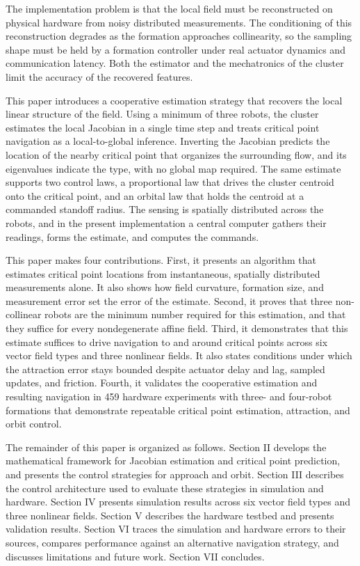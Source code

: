 \documentclass[lettersize,journal]{IEEEtran}
\newcommand{\rev}[1]{#1}
\begin{document}
The implementation problem is that the local field must be reconstructed on physical hardware from noisy distributed measurements. The conditioning of this reconstruction degrades as the formation approaches collinearity, so the sampling shape must be held by a formation controller under real actuator dynamics and communication latency. Both the estimator and the mechatronics of the cluster limit the accuracy of the recovered features.

This paper introduces a cooperative estimation strategy that recovers the local linear structure of the field. Using a minimum of three robots, the cluster estimates the local Jacobian in a single time step and treats critical point navigation as a local-to-global inference. Inverting the Jacobian predicts the location of the nearby critical point that organizes the surrounding flow, and its eigenvalues indicate the type, with no global map required. The same estimate supports two control laws, a proportional law that drives the cluster centroid onto the critical point, and an orbital law that holds the centroid at a commanded standoff radius. The sensing is spatially distributed across the robots, and in the present implementation a central computer gathers their readings, forms the estimate, and computes the commands.

This paper makes four contributions. First, it presents an algorithm that estimates critical point locations from instantaneous, spatially distributed measurements alone. It also shows how field curvature, formation size, and measurement error set the error of the estimate. Second, it proves that three non-collinear robots are the minimum number required for this estimation, and that they suffice for every nondegenerate affine field. Third, it demonstrates that this estimate suffices to drive navigation to and around critical points across six vector field types and three nonlinear fields. It also states conditions under which the attraction error stays bounded despite actuator delay and lag, sampled updates, and friction. Fourth, it validates the cooperative estimation and resulting navigation in \rev{459} hardware experiments with three- and four-robot formations that demonstrate repeatable critical point estimation, attraction, and orbit control.

The remainder of this paper is organized as follows. Section II develops the mathematical framework for Jacobian estimation and critical point prediction, and presents the control strategies for approach and orbit. Section III describes the control architecture used to evaluate these strategies in simulation and hardware. Section IV presents simulation results across six vector field types and three nonlinear fields. Section V describes the hardware testbed and presents validation results. Section VI traces the simulation and hardware errors to their sources, compares performance against an alternative navigation strategy, and discusses limitations and future work. Section VII concludes.
\end{document}
